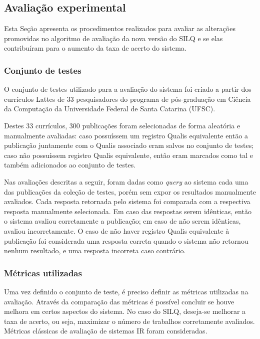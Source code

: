 \documentclass[12pt]{article}
\begin{document}
\subsection{Avaliação experimental} \label{sec:validation}

Esta Seção apresenta os procedimentos realizados para avaliar as alterações promovidas no algoritmo de avaliação da nova versão do SILQ e se elas contribuíram para o aumento da taxa de acerto do sistema.

\subsubsection{Conjunto de testes}

O conjunto de testes utilizado para a avaliação do sistema foi criado a partir dos currículos Lattes de 33 pesquisadores do programa de pós-graduação em Ciência da Computação da Universidade Federal de Santa Catarina (UFSC).

Destes 33 currículos, 300 publicações foram selecionadas de forma aleatória e manualmente avaliadas: caso possuíssem um registro Qualis equivalente então a publicação juntamente com o Qualis associado eram salvos no conjunto de testes; caso não possuíssem registro Qualis equivalente, então eram marcados como tal e também adicionados ao conjunto de testes.

Nas avaliações descritas a seguir, foram dadas como \textit{query} ao sistema cada uma das publicações da coleção de testes, porém sem expor os resultados manualmente avaliados. Cada resposta retornada pelo sistema foi comparada com a respectiva resposta manualmente selecionada. Em caso das respostas serem idênticas, então o sistema avaliou corretamente a publicação; em caso de não serem idênticas, avaliou incorretamente. O caso de não haver registro Qualis equivalente à publicação foi considerada uma resposta correta quando o sistema não retornou nenhum resultado, e uma resposta incorreta caso contrário.

\subsubsection{Métricas utilizadas}

Uma vez definido o conjunto de teste, é preciso definir as métricas utilizadas na avaliação. Através da comparação das métricas é possível concluir se houve melhora em certos aspectos do sistema. No caso do SILQ, deseja-se melhorar a taxa de acerto, ou seja, maximizar o número de trabalhos corretamente avaliados. Métricas clássicas de avaliação de sistemas IR foram consideradas.
\end{document}
